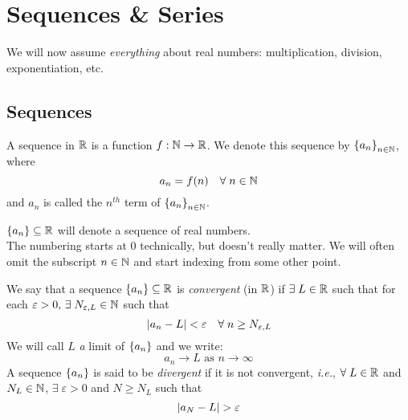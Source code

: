 \section{Sequences \& Series}
We will now assume \emph{everything} about real numbers: multiplication, division, exponentiation, etc.

\subsection{Sequences} \vskip 5pt
\begin{defn} \label{defn:sequence}
    A sequence in $\mathbb{R}$ is a function $f: \mathbb{N} \to \mathbb{R}$. We denote this sequence by $\set{a_{n}}_{n \in \N}$, where \[
        a_{n} = f(n) \quad \forall\; n \in \mathbb{N}
    \] and $a_{n}$ is called the $n^{th}$ term of $\set{a_{n}}_{n \in \N}$.
\end{defn}
\begin{rem}
    $\set{a_{n}} \subseteq \R$ will denote a sequence of real numbers. \\
    The numbering starts at 0 technically, but doesn't really matter. We will often omit the subscript $n \in \mathbb{N}$ and start indexing from some other point.
\end{rem}

\begin{defn} \label{defn:sequence:convergence}
    We say that a sequence $\set{a_{n}} \subseteq \R$ is \emph{convergent} (in $\mathbb{R}$) if $\exists\; L \in \mathbb{R}$ such that for each $\varepsilon > 0, \,\exists\; N_{\varepsilon,L} \in \mathbb{N}$ such that \[
        \abs{a_{n} - L} < \varepsilon \quad \forall\; n \geq N_{\varepsilon, L}
    \] 
    We will call $L$ \emph{a} limit of $\set{a_{n}}$ and we write: \[
        a_{n} \to L \text{ as } n \to \infty
    \]
    A sequence $\set{a_{n}}$ is said to be \emph{divergent} if it is not convergent, \textit{i.e.}, $\forall\; L \in \mathbb{R}$ and $N_{L} \in \mathbb{N}$, $\exists\; \varepsilon > 0$ and $N \geq N_{L}$ such that \[
        \abs{a_{N} - L} > \varepsilon
    \]
\end{defn}

